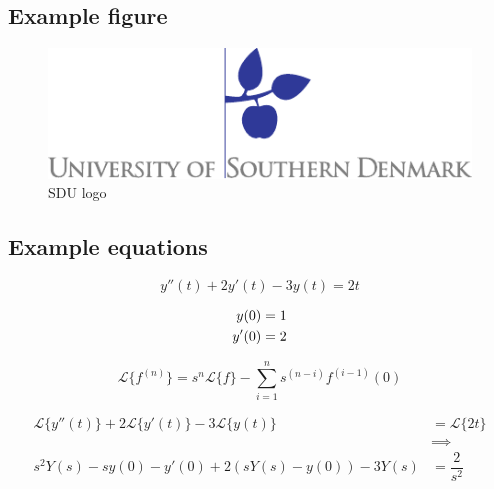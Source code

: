 \subsection{Example figure}

\begin{figure}[htb]
	\centering
	\includegraphics[scale=1,trim=0 0 0 0]{content/00_frontmatter/sdu_logo.pdf} %
	\caption{SDU logo}
	\label{fig:sdu_logo_xx}			%
\end{figure}






\subsection{Example equations}

\begin{equation}						%
	y''(t)+2y'(t)-3y(t)=2t
	\label{eq:opg1}
\end{equation}


\begin{align}								%
	y(0)&=1\notag\\						%
	y'(0)&=2
	\label{eq:opg1_beting}		%
\end{align}

\begin{equation}
	\boxed
	{
		\mathcal{L}\{f^{(n)}\} = s^{n} \mathcal{L}\{f\} - \sum_{i=1}^{n} s^{(n-i)} f^{(i-1)}(0)		%
	}
	\label{eq:opg1_lapl_difflign}
\end{equation}


\begin{align*}			%
	\mathcal{L}\{y''(t)\}+2\mathcal{L}\{y'(t)\}-3\mathcal{L}\{y(t)\}&=\mathcal{L}\{2t\}\\
	&\implies \\
	s^{2} Y(s) - s y(0) - y'(0) +2 \left( s Y(s)-y(0) \right) -3 Y(s) &= \dfrac{2}{s^{2}}
\end{align*}





